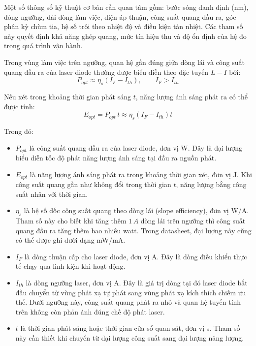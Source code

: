 Một số thông số kỹ thuật cơ bản cần quan tâm gồm: bước sóng danh định (nm), dòng ngưỡng, dải dòng làm việc, điện áp thuận, công suất quang đầu ra, góc phân kỳ chùm tia, hệ số trôi theo nhiệt độ và điều kiện tản nhiệt. Các tham số này quyết định khả năng ghép quang, mức tín hiệu thu và độ ổn định của hệ đo trong quá trình vận hành.

Trong vùng làm việc trên ngưỡng, quan hệ gần đúng giữa dòng lái và công suất quang đầu ra của laser diode thường được biểu diễn theo đặc tuyến \(L\!-\!I\) bởi:
\begin{equation}
P_{opt} \approx \eta_s \left(I_F - I_{th}\right), \qquad I_F > I_{th}
\end{equation}

Nếu xét trong khoảng thời gian phát sáng \(t\), năng lượng ánh sáng phát ra có thể được tính:
\begin{equation}
E_{opt} = P_{opt}\,t \approx \eta_s \left(I_F - I_{th}\right)t
\end{equation}

Trong đó:
\begin{itemize}
    \item \(P_{opt}\) là công suất quang đầu ra của laser diode, đơn vị W. Đây là đại lượng biểu diễn tốc độ phát năng lượng ánh sáng tại đầu ra nguồn phát.
    \item \(E_{opt}\) là năng lượng ánh sáng phát ra trong khoảng thời gian xét, đơn vị J. Khi công suất quang gần như không đổi trong thời gian \(t\), năng lượng bằng công suất nhân với thời gian.
    \item \(\eta_s\) là hệ số dốc công suất quang theo dòng lái (slope efficiency), đơn vị W/A. Tham số này cho biết khi tăng thêm \(1\,A\) dòng lái trên ngưỡng thì công suất quang đầu ra tăng thêm bao nhiêu watt. Trong datasheet, đại lượng này cũng có thể được ghi dưới dạng mW/mA.
    \item \(I_F\) là dòng thuận cấp cho laser diode, đơn vị A. Đây là dòng điều khiển thực tế chạy qua linh kiện khi hoạt động.
    \item \(I_{th}\) là dòng ngưỡng laser, đơn vị A. Đây là giá trị dòng tại đó laser diode bắt đầu chuyển từ vùng phát xạ tự phát sang vùng phát xạ kích thích chiếm ưu thế. Dưới ngưỡng này, công suất quang phát ra nhỏ và quan hệ tuyến tính trên không còn phản ánh đúng chế độ phát laser.
    \item \(t\) là thời gian phát sáng hoặc thời gian cửa sổ quan sát, đơn vị s. Tham số này cần thiết khi chuyển từ đại lượng công suất sang đại lượng năng lượng.
\end{itemize}

